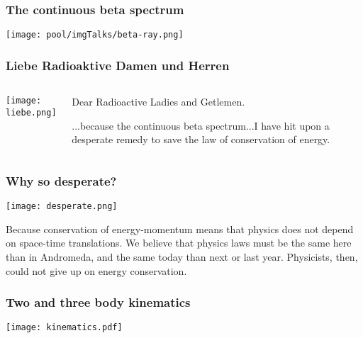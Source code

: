 \begin{frame}
\frametitle{The continuous beta spectrum}

\texttt{[image: pool/imgTalks/beta-ray.png]}
 
\end{frame}


\begin{frame}
\frametitle{Liebe Radioaktive Damen und Herren}
\begin{columns}
 
\texttt{[image: liebe.png]}
 
\begin{block}{}
Dear Radioactive Ladies and Getlemen.

...because the continuous beta spectrum...I have hit upon a desperate remedy to save the law of conservation of energy.

\end{block}
\end{columns}
\end{frame}


\begin{frame}
\frametitle{Why so desperate?}

\texttt{[image: desperate.png]}
 

\begin{block}{}
Because conservation of energy-momentum means that physics does not depend on space-time translations. We believe that physics laws must be the same here than in Andromeda, and the same today than next or last year. Physicists, then, could not give up on energy conservation.

\end{block}

\end{frame}

\begin{frame}
\frametitle{Two and three body kinematics}

\texttt{[image: kinematics.pdf]}
 
\end{frame}

